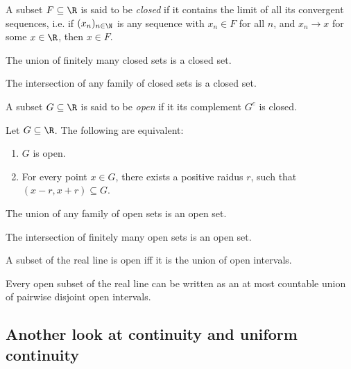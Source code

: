 \documentclass{article}
\begin{document}
\begin{definition}
	A subset $F\subseteq\R$ is said to be \emph{closed} if it contains the limit of all
	its convergent sequences, i.e. if $(x_n)_{n\in\N}$ is any sequence with $x_n\in F$
	for all $n$, and $x_n\to x$ for some $x\in\R$, then $x\in F$.
\end{definition}

\begin{proposition}[2.2]
	The union of finitely many closed sets is a closed set.
\end{proposition}

\begin{proposition}[2.4]
	The intersection of any family of closed sets is a closed set.
\end{proposition}

\begin{definition}
	A subset $G\subseteq\R$ is said to be \emph{open} if it its complement $G^c$ is closed.
\end{definition}

\begin{proposition}[2.6]
	Let $G\subseteq\R$. The following are equivalent:
	\begin{enumerate}
		\item $G$ is open.
		\item For every point $x\in G$, there exists a positive raidus $r$, such that
		      $(x-r,x+r)\subseteq G$.
	\end{enumerate}
\end{proposition}

\begin{proposition}[2.8]
	The union of any family of open sets is an open set.
\end{proposition}

\begin{proposition}[2.9]
	The intersection of finitely many open sets is an open set.
\end{proposition}

\begin{theorem}[2.10]
	A subset of the real line is open iff it is the union of open intervals.
\end{theorem}

\begin{theorem}[2.11]
	Every open subset of the real line can be written as an at most countable union
	of pairwise disjoint open intervals.
\end{theorem}

\subsection{Another look at continuity and uniform continuity}
\end{document}
